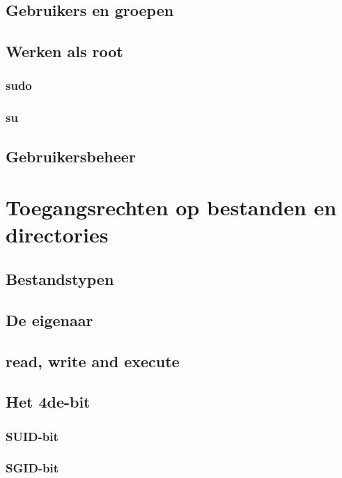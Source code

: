 \documentclass[a4paper,12pt,twoside,openright,titlepage]{book}
\begin{document}
\section{Gebruikers en groepen}



\section{Werken als root}

\subsection{sudo}

\subsection{su}

\section{Gebruikersbeheer}







\chapter{Toegangsrechten op bestanden en directories}


\section{Bestandstypen}

\section{De eigenaar}

\section{read, write and execute}


\section{Het 4de-bit}

\subsection{SUID-bit}

\subsection{SGID-bit}

\end{document}
